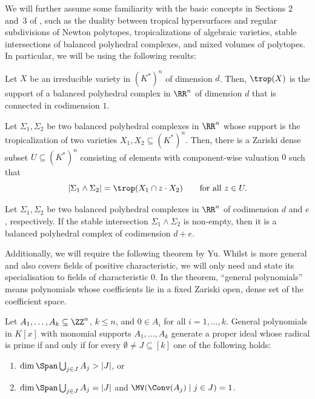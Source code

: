 We will further assume some familiarity with the basic concepts in Sections 2 and~3 of \cite{MaclaganSturmfels15}, such as the duality between tropical hypersurfaces and regular subdivisions of Newton polytopes, tropicalizations of algebraic varieties, stable intersections of balanced polyhedral complexes, and mixed volumes of polytopes. In particular, we will be using the following results:

\begin{theorem}\label{thm:StructureTheorem}
  Let $X$ be an irreducible variety in $(K^\ast)^n$ of dimension $d$. Then, $\trop(X)$ is the support of a balanced polyhedral complex in $\RR^n$ of dimension $d$ that is connected in codimension $1$.
\end{theorem}

\begin{theorem}\label{thm:stableTropicalization}
  Let $\Sigma_1,\Sigma_2$ be two balanced polyhedral complexes in $\RR^n$ whose support is the tropicalization of two varieties $X_1,X_2\subseteq (K^\ast)^n$. Then, there is a Zariski dense subset $U\subseteq (K^\ast)^n$ consisting of elements with component-wise valuation $0$ such that
  \[ |\Sigma_1\wedge\Sigma_2| = \trop(X_1\cap z\cdot X_2) \qquad \text{for all }z\in U. \]
\end{theorem}

\begin{theorem}\label{thm:stableIntersection}
  Let $\Sigma_1,\Sigma_2$ be two balanced polyhedral complexes in $\RR^n$ of codimension $d$ and $e$, respectively. If the stable intersection $\Sigma_1\wedge\Sigma_2$ is non-empty, then it is a balanced polyhedral complex of codimension $d+e$.
\end{theorem}

Additionally, we will require the following theorem by Yu. Whilst {\cite[Theorem~3]{Yu16}} is more general and also covers fields of positive characteristic, we will only need and state its specialisation to fields of characteristic $0$. In the theorem, ``general polynomials'' means polynomials whose coefficients lie in a fixed Zariski open, dense set of the coefficient space.

\begin{theorem}[{\cite[Theorem 3]{Yu16}}]\label{thm:Yu}
  Let $A_1,\dots,A_k\subseteq\ZZ^n$, $k\leq n$, and $0\in A_i$ for all $i=1,\dots,k$. General polynomials in $K[x]$ with monomial supports $A_1,\dots,A_k$ generate a proper ideal whose radical is prime if and only if for every $\emptyset\neq J\subseteq [k]$ one of the following holds:
  \begin{enumerate}
  \item\label{enumitem:Yu1} $\dim \Span\bigcup_{j\in J}A_j>|J|$, or
  \item\label{enumitem:Yu2} $\dim \Span\bigcup_{j\in J}A_j=|J|$ and $\MV(\Conv(A_j)\mid j\in J)=1$.
  \end{enumerate}
\end{theorem}

